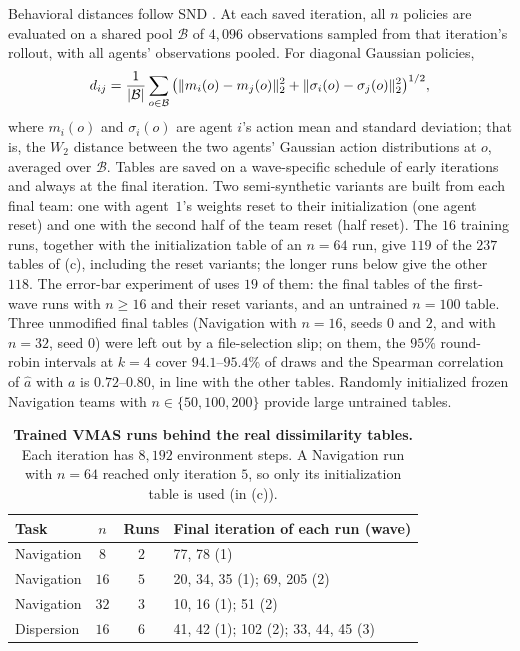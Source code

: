Behavioral distances follow SND \citep{bettini2025snd}. At each saved iteration,
all $n$ policies are evaluated on a shared pool $\mathcal B$ of $4{,}096$ observations sampled
from that \mbox{iteration's} rollout, with all agents' observations pooled. For diagonal
Gaussian policies,
\[d_{ij}=\frac{1}{|\mathcal B|}\sum_{o\in\mathcal B}\big(\lVert m_i(o)-m_j(o)\rVert_2^2+\lVert\sigma_i(o)-\sigma_j(o)\rVert_2^2\big)^{1/2},\]
where $m_i(o)$ and $\sigma_i(o)$ are agent $i$'s action mean and standard deviation; that is, the $W_2$ distance between the two agents' Gaussian action distributions at $o$, averaged over $\mathcal B$. Tables are saved on a wave-specific schedule
of early iterations and always at the final iteration. Two semi-synthetic variants
are built from each final team: one with agent~$1$'s weights reset to their initialization
(one agent reset) and one with the second half of the team reset (half reset). The $16$ training runs,
together with the initialization table of an $n=64$ run, give $119$ of the $237$ tables of
(c), including the reset variants; the longer runs below give the other $118$. The error-bar
experiment of  uses $19$ of them: the final tables of the first-wave runs with
$n\ge16$ and their reset variants, and an untrained $n=100$ table. Three unmodified final tables
(Navigation with $n=16$, seeds $0$ and $2$, and with $n=32$, seed $0$) were left out by a
file-selection slip; on them, the $95\%$ round-robin intervals at $k=4$ cover
$94.1$--$95.4\%$ of draws and the Spearman correlation of $\widehat a$ with $a$ is
$0.72$--$0.80$, in line with the other tables. Randomly initialized frozen
Navigation teams with $n\in\{50,100,200\}$ provide large untrained tables.

\begin{table}[ht]
\centering
\small
\caption{\textbf{Trained VMAS runs behind the real dissimilarity tables.} Each iteration
has $8{,}192$ environment steps. A Navigation run with $n=64$ reached only
iteration $5$, so only its initialization table is used (in (c)).}
\label{tab:vmas-runs}
\begin{tabular}{@{}lccl@{}}
\toprule
Task & $n$ & Runs & Final iteration of each run (wave) \\
\midrule
Navigation & $8$ & $2$ & 77, 78 (1) \\
Navigation & $16$ & $5$ & 20, 34, 35 (1); 69, 205 (2) \\
Navigation & $32$ & $3$ & 10, 16 (1); 51 (2) \\
Dispersion & $16$ & $6$ & 41, 42 (1); 102 (2); 33, 44, 45 (3) \\
\bottomrule
\end{tabular}
\end{table}

